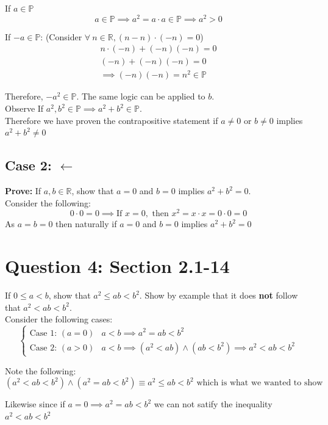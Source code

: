 \documentclass[11pt]{article}
\theoremstyle{plain}
\begin{document}
If $a \in \mathbb{P}$
\[
	a \in \mathbb{P} \implies a^2 = a \cdot a  \in \mathbb{P} \implies a^2 > 0
\]

If $-a \in \mathbb{P}$: (Consider $\forall ~n \in \mathbb{R}, (n-n) \cdot (-n) = 0$) \\
\[
	\begin{aligned}
		n \cdot (-n) + (-n)(-n) = 0 \\
		(-n) + (-n)(-n) = 0         \\
		\implies (-n)(-n) = n^2 \in \mathbb{P}
	\end{aligned}
\]
\begin{center}
	Therefore, $-a^2 \in \mathbb{P}$. The same logic can be applied to $b$. \\ \vspace{2em}
	Observe If $a^2,b^2 \in \mathbb{P} \implies a^2+b^2 \in \mathbb{P}$. \\ \vspace{2em}
	Therefore we have proven the contrapositive statement if $a \neq 0$ or $b \neq 0$ implies $a^2 + b^2 \neq 0$
\end{center}
\subsection*{Case 2: $\leftarrow$}
\textbf{Prove:} If $a,b \in \mathbb{R}$, show that $a=0$ and $b=0$ implies $a^2+b^2=0$. \\
Consider the following:
\[
	0 \cdot 0 = 0 \implies \text{If } x=0, \text{ then } x^2 = x \cdot x = 0 \cdot 0 = 0
\]
As $a=b=0$ then naturally if $a=0$ and $b=0$ implies $a^2+b^2=0$
\section*{Question 4: Section 2.1-14}
If $0 \leq a<b$, show that $a^2 \leq ab < b^2$. Show by example that it does \textbf{not} follow that $a^2 <ab < b^2$. \\
Consider the following cases:
\[
	\begin{cases}
		\text{Case 1: } (a = 0) & a < b \implies a^2 = ab < b^2                                      \\
		\text{Case 2: } (a > 0) & a < b \implies (a^2 < ab) \land (ab < b^2) \implies a^2 < ab < b^2
	\end{cases}
\]

Note the following:
\[
	(a^2 < ab < b^2) \land (a^2 = ab < b^2) \equiv a^2 \leq ab < b^2 \text{ which is what we wanted to show}
\]

Likewise since if $a=0 \implies  a^2 = ab < b^2$ we can not satify the inequality $a^2 <ab < b^2$
\end{document}
